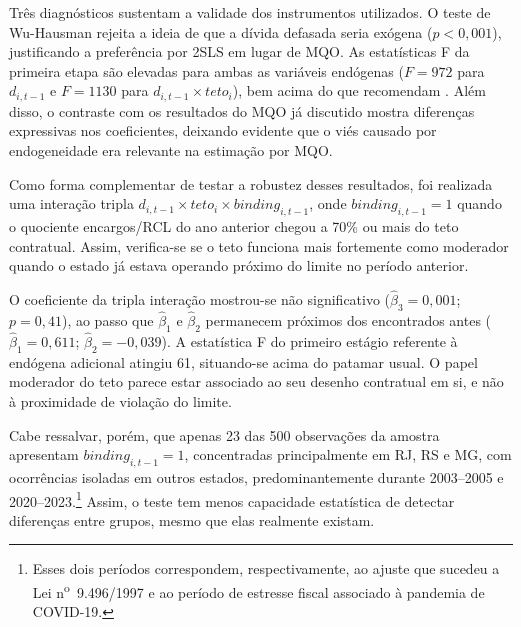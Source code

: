 Três diagnósticos sustentam a validade dos instrumentos utilizados. O teste de Wu-Hausman rejeita a ideia de que a dívida defasada seria exógena ($p < 0{,}001$), justificando a preferência por 2SLS em lugar de MQO. As estatísticas F da primeira etapa são elevadas para ambas as variáveis endógenas ($F = 972$ para $d_{i,t-1}$ e $F = 1130$ para $d_{i,t-1} \times teto_i$), bem acima do que recomendam . Além disso, o contraste com os resultados do MQO já discutido mostra diferenças expressivas nos coeficientes, deixando evidente que o viés causado por endogeneidade era relevante na estimação por MQO.

Como forma complementar de testar a robustez desses resultados, foi realizada uma interação tripla $d_{i,t-1} \times teto_i \times binding_{i,t-1}$, onde $binding_{i,t-1} = 1$ quando o quociente encargos/RCL do ano anterior chegou a 70\% ou mais do teto contratual. Assim, verifica-se se o teto funciona mais fortemente como moderador quando o estado já estava operando próximo do limite no período anterior.

O coeficiente da tripla interação mostrou-se não significativo ($\hat{\beta}_3 = 0{,}001$; $p = 0{,}41$), ao passo que $\hat{\beta}_1$ e $\hat{\beta}_2$ permanecem próximos dos encontrados antes ($\hat{\beta}_1 = 0{,}611$; $\hat{\beta}_2 = -0{,}039$). A estatística F do primeiro estágio referente à endógena adicional atingiu 61, situando-se acima do patamar usual. O papel moderador do teto parece estar associado ao seu desenho contratual em si, e não à proximidade de violação do limite.

Cabe ressalvar, porém, que apenas 23 das 500 observações da amostra apresentam $binding_{i,t-1} = 1$, concentradas principalmente em RJ, RS e MG, com ocorrências isoladas em outros estados, predominantemente durante 2003--2005 e 2020--2023.\footnote{Esses dois períodos correspondem, respectivamente, ao ajuste que sucedeu a Lei n\textsuperscript{o}~9.496/1997 e ao período de estresse fiscal associado à pandemia de COVID-19.} Assim, o teste tem menos capacidade estatística de detectar diferenças entre grupos, mesmo que elas realmente existam.

